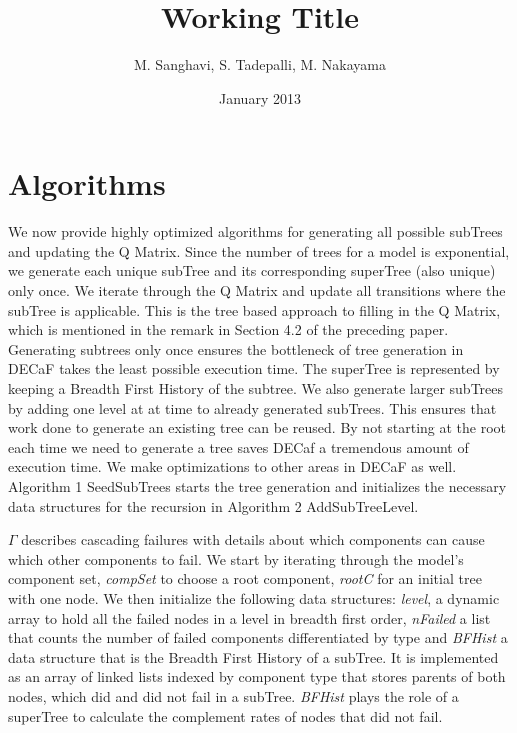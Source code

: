 \documentclass[12pt]{article}
\author{M. Sanghavi, S. Tadepalli, M. Nakayama}
\date{January 2013}
\newcommand{\Varname}[1]{\textrm{\it#1}}
\begin{document}
\title{Working Title}
\maketitle



\section{Algorithms}
\label{sec:alg}

We now provide highly optimized algorithms for generating all possible subTrees and updating the Q Matrix. Since the number of trees for a model is exponential, we generate each unique subTree and its corresponding superTree (also unique) only once. We iterate through the Q Matrix and update all transitions where the subTree is applicable. This is the tree based approach to filling in the Q Matrix, which is mentioned in the remark in Section 4.2 of the preceding paper. \cite{Iyer:2009} Generating subtrees only once ensures the bottleneck of tree generation in DECaF takes the least possible execution time. The superTree is represented by keeping a Breadth First History of the subtree. We also generate larger subTrees by adding one level at at time to already generated subTrees. This ensures that work done to generate an existing tree can be reused. By not starting at the root each time we need to generate a tree saves DECaf a tremendous amount of execution time. We make optimizations to other areas in DECaF as well. \\ 

Algorithm 1 SeedSubTrees starts the tree generation and initializes the necessary data structures for the recursion in Algorithm 2 AddSubTreeLevel. 

$\Gamma$ describes cascading failures with details about which components can cause which other components to fail. 
We start by iterating through the model's component set, \Varname{compSet} to choose a root component, \Varname{rootC} for an initial tree with one node. We then initialize the following data structures: \Varname{level}, a dynamic array to hold all the failed nodes in a level in breadth first order, \Varname{nFailed} a list that counts the number of failed components differentiated by type and \Varname{BFHist} a data structure that is the Breadth First History of a subTree. It is implemented as an array of linked lists indexed by component type that stores parents of both nodes, which did and did not fail in a subTree. \Varname{BFHist} plays the role of a superTree to calculate the complement rates of nodes that did not fail.
\end{document}
